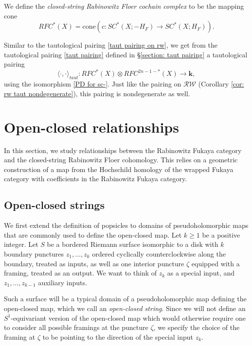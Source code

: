 \documentclass[11pt]{amsproc}
\def\K{{\mathbf{k}}}
\def\rw{\mathcal{RW}}
\def\cone{\mathrm{cone}}
\theoremstyle{remark}
\numberwithin{equation}{section}
\begin{document}
We define the {\it closed-string Rabinowitz Floer cochain complex} to be the mapping cone
\begin{equation}\label{closed-string rfc}
RFC^{*}(X) = \cone(c: SC^{*}(X; -H_{F}) \to SC^{*}(X; H_{F}) ).
\end{equation}


Similar to the tautological pairing \eqref{taut pairing on rw}, 
we get from the tautological pairing \eqref{taut pairing} defined in \S\ref{section: taut pairing} a tautological pairing
\begin{equation}\label{taut pairing on rfc}
\langle \cdot, \cdot \rangle_{taut}: RFC^{*}(X) \otimes RFC^{2n-1-*}(X) \to \K,
\end{equation}
using the isomorphism \eqref{PD for sc-}.
Just like the pairing on $\rw$ (Corollary \ref{cor: rw taut nondegenerate}), this pairing is nondegenerate as well.


\section{Open-closed relationships}\label{section: open-closed}

In this section, we study relationships between the Rabinowitz Fukaya category and the closed-string Rabinowitz Floer cohomology.
This relies on a geometric construction of a map from the Hochschild homology of the wrapped Fukaya category with coefficients in the Rabinowitz Fukaya category.


\subsection{Open-closed strings}\label{section: popsicles on open-closed strings}

We first extend the definition of popsicles to domains of pseudoholomorphic maps that are commonly used to define the open-closed map.
Let $k \ge 1$ be a positive integer.
Let $S$ be a bordered Riemann surface isomorphic to a disk with $k$ boundary punctures $z_{1}, \ldots, z_{k}$ ordered cyclically counterclockwise along the boundary, treated as inputs,
as well as one interior puncture $\zeta$ equipped with a framing, treated as an output.
We want to think of $z_{k}$ as a special input, 
and $z_{1}, \ldots, z_{k-1}$ auxiliary inputs.

Such a surface will be a typical domain of a pseudoholomorphic map defining the open-closed map,
which we call an {\it open-closed string}.
Since we will not define an $S^{1}$-equivariant version of the open-closed map which would otherwise require one to consider all possible framings at the puncture $\zeta$,
we specify the choice of the framing at $\zeta$ to be pointing to the direction of the special input $z_{k}$.
\end{document}
